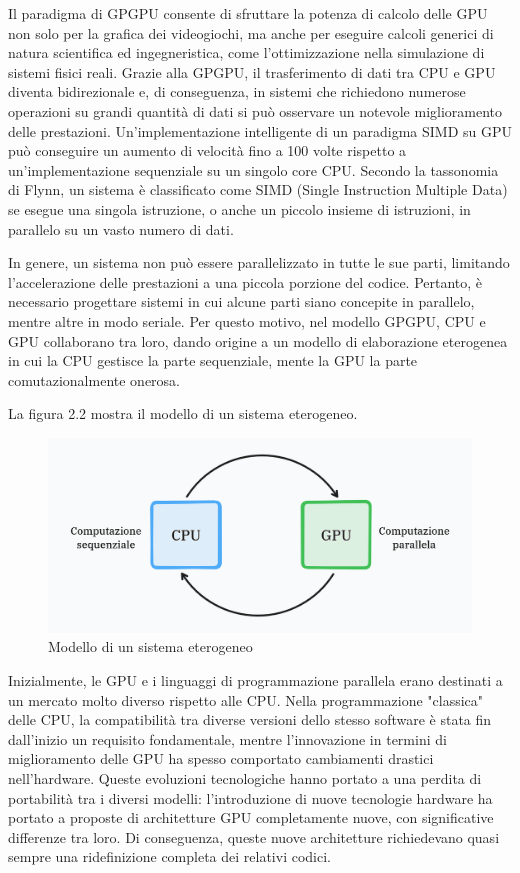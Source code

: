 Il paradigma di GPGPU consente di sfruttare la potenza di calcolo delle GPU non solo per la grafica dei videogiochi, ma anche per eseguire calcoli generici di natura scientifica ed ingegneristica, come l'ottimizzazione nella simulazione di sistemi fisici reali. Grazie alla GPGPU, il trasferimento di dati tra CPU e GPU diventa bidirezionale e, di conseguenza, in sistemi che richiedono numerose operazioni su grandi quantità di dati si può osservare un notevole miglioramento delle prestazioni. Un'implementazione intelligente di un paradigma SIMD su GPU può conseguire un aumento di velocità fino a 100 volte rispetto a un'implementazione sequenziale su un singolo core CPU. Secondo la tassonomia di Flynn, un sistema è classificato come SIMD (Single Instruction Multiple Data) se esegue una singola istruzione, o anche un piccolo insieme di istruzioni, in parallelo su un vasto numero di dati.

In genere, un sistema non può essere parallelizzato in tutte le sue parti, limitando l'accelerazione delle prestazioni a una piccola porzione del codice. Pertanto, è necessario progettare sistemi in cui alcune parti siano concepite in parallelo, mentre altre in modo seriale. Per questo motivo, nel modello GPGPU, CPU e GPU collaborano tra loro, dando origine a un modello di elaborazione eterogenea in cui la CPU gestisce la parte sequenziale, mente la GPU la parte comutazionalmente onerosa.

La figura 2.2 mostra il modello di un sistema eterogeneo.

\begin{figure}[ht]
    \centering
    \includegraphics[width=.9\linewidth]{images/chapter2/het_model2.png}
    \caption{Modello di un sistema eterogeneo}
    \label{fig:het_model}
\end{figure}


Inizialmente, le GPU e i linguaggi di programmazione parallela erano destinati a un mercato molto diverso rispetto alle CPU. Nella programmazione "classica" delle CPU, la compatibilità tra diverse versioni dello stesso software è stata fin dall'inizio un requisito fondamentale, mentre l'innovazione in termini di miglioramento delle GPU ha spesso comportato cambiamenti drastici nell'hardware. Queste evoluzioni tecnologiche hanno portato a una perdita di portabilità tra i diversi modelli: l'introduzione di nuove tecnologie hardware ha portato a proposte di architetture GPU completamente nuove, con significative differenze tra loro. Di conseguenza, queste nuove architetture richiedevano quasi sempre una ridefinizione completa dei relativi codici. 


